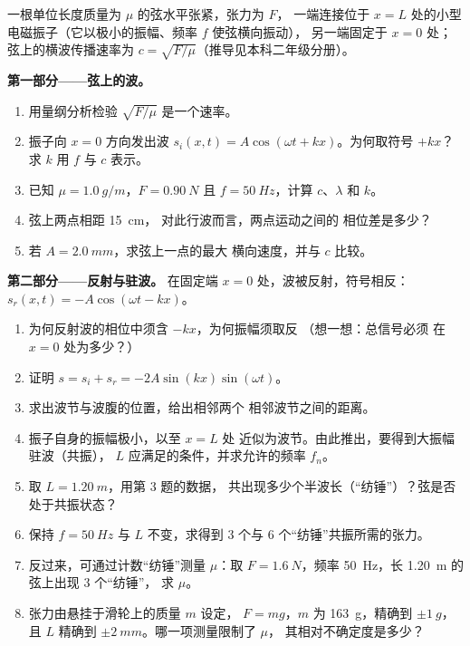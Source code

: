 \begin{problem}
\label{pb:b1:wave-propagation:1}
一根单位长度质量为 $\mu$ 的弦水平张紧，张力为 $F$，
一端连接位于 $x = L$ 处的小型电磁振子（它以极小的振幅、频率 $f$ 使弦横向振动），
另一端固定于 $x = 0$ 处；
弦上的横波传播速率为
$c = \sqrt{F/\mu}$（推导见本科二年级分册）。

\medskip
\noindent\textbf{第一部分——弦上的波。}
\begin{enumerate}
  \item 用量纲分析检验 $\sqrt{F/\mu}$ 是一个速率。
  \item 振子向 $x = 0$ 方向发出波
        $s_i(x, t) = A\cos(\omega t + kx)$。为何取符号 $+kx$？求 $k$
        用 $f$ 与 $c$ 表示。
  \item 已知 $\mu = \qty{1.0}{g/m}$，$F = \qty{0.90}{N}$ 且
        $f = \qty{50}{Hz}$，计算 $c$、$\lambda$ 和 $k$。
  \item 弦上两点相距 \qty{15}{cm}，
        对此行波而言，两点运动之间的
        相位差是多少？
  \item 若 $A = \qty{2.0}{mm}$，求弦上一点的最大
        横向速度，并与 $c$ 比较。
\end{enumerate}

\medskip
\noindent\textbf{第二部分——反射与驻波。}
在固定端 $x = 0$ 处，波被反射，符号相反：
$s_r(x, t) = -A\cos(\omega t - kx)$。
\begin{enumerate}[resume]
  \item 为何反射波的相位中须含 $-kx$，为何振幅须取反
        （想一想：总信号必须
        在 $x = 0$ 处为多少？）
  \item 证明 $s = s_i + s_r = -2A\sin(kx)\sin(\omega t)$。
  \item 求出波节与波腹的位置，给出相邻两个
        相邻波节之间的距离。
  \item 振子自身的振幅极小，以至 $x = L$ 处
        近似为波节。由此推出，要得到大振幅驻波（共振），
        $L$ 应满足的条件，并求允许的频率 $f_n$。
  \item 取 $L = \qty{1.20}{m}$，用第 3 题的数据，
        共出现多少个半波长（“纺锤”）？弦是否
        处于共振状态？
  \item 保持 $f = \qty{50}{Hz}$ 与 $L$ 不变，求得到
        $3$ 个与 $6$ 个“纺锤”共振所需的张力。
  \item 反过来，可通过计数“纺锤”测量 $\mu$：取
        $F = \qty{1.6}{N}$，频率 \qty{50}{Hz}，长 \qty{1.20}{m} 的弦上出现 $3$ 个“纺锤”，
        求 $\mu$。
  \item 张力由悬挂于滑轮上的质量 $m$ 设定，
        $F = mg$，$m$ 为 \qty{163}{g}，精确到 $\pm\qty{1}{g}$，且
        $L$ 精确到 $\pm\qty{2}{mm}$。哪一项测量限制了 $\mu$，
        其相对不确定度是多少？
\end{enumerate}


\end{problem}
